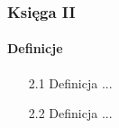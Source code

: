 \subsubsection{Księga II}	
\paragraph{Definicje}	
\begin{enumerate}
    \item [2.1] Definicja ...
    \item [2.2] Definicja ...
\end{enumerate}	
	
